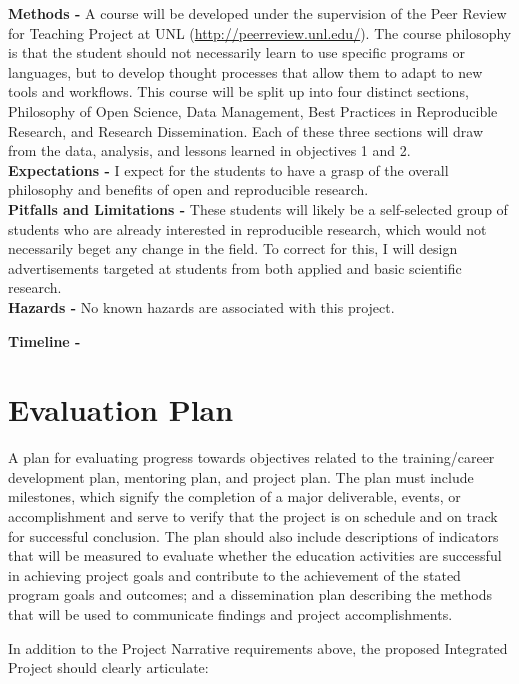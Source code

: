 \documentclass[12pt,letterpaper]{article}
\begin{document}
\noindent \textbf{Methods -} A course will be developed under the supervision of the Peer Review for Teaching Project at UNL (\url{http://peerreview.unl.edu/}). 
The course philosophy is that the student should not necessarily learn to use specific programs or languages, but to develop thought processes that allow them to adapt to new tools and workflows.
This course will be split up into four distinct sections, Philosophy of Open Science, Data Management, Best Practices in Reproducible Research, and Research Dissemination. 
Each of these three sections will draw from the data, analysis, and lessons learned in objectives 1 and 2.\\
\noindent \textbf{Expectations -}
I expect for the students to have a grasp of the overall philosophy and benefits of open and reproducible research.\\
\noindent \textbf{Pitfalls and Limitations -}
These students will likely be a self-selected group of students who are already interested in reproducible research, which would not necessarily beget any change in the field. To correct for this, I will design advertisements targeted at students from both applied and basic scientific research.\\

\noindent \textbf{Hazards -} No known hazards are associated with this project.

\noindent \textbf{Timeline - }

\section{Evaluation Plan}

A plan for evaluating progress towards objectives related to the
training/career development plan, mentoring plan, and project plan. The plan
must include milestones, which signify the completion of a major deliverable,
events, or accomplishment and serve to verify that the project is on schedule
and on track for successful conclusion. The plan should also include
descriptions of indicators that will be measured to evaluate whether the
education activities are successful in achieving project goals and contribute
to the achievement of the stated program goals and outcomes; and a
dissemination plan describing the methods that will be used to communicate
findings and project accomplishments.

In addition to the Project Narrative requirements above, the proposed
Integrated Project should clearly articulate:
\end{document}

